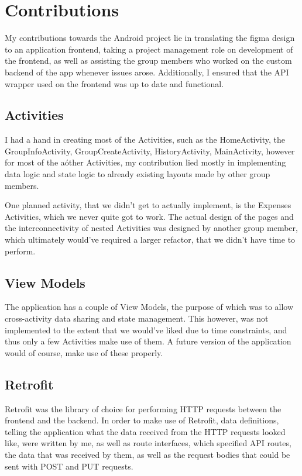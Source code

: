 \section*{Contributions}
My contributions towards the Android project lie in translating the figma design to an application frontend, taking a project management role on development of the frontend, as well as assisting the group members who worked on the custom backend of the app whenever issues arose. Additionally, I ensured that the API wrapper used on the frontend was up to date and functional.

\subsection*{Activities}
I had a hand in creating most of the Activities, such as the HomeActivity, the GroupInfoActivity, GroupCreateActivity, HistoryActivity, MainActivity, however for most of the aóther Activities, my contribution lied mostly in implementing data logic and state logic to already existing layouts made by other group members.

One planned activity, that we didn't get to actually implement, is the Expenses Activities, which we never quite got to work. The actual design of the pages and the interconnectivity of nested Activities was designed by another group member, which ultimately would've required a larger refactor, that we didn't have time to perform.

\subsection*{View Models}
The application has a couple of View Models, the purpose of which was to allow cross-activity data sharing and state management. This however, was not implemented to the extent that we would've liked due to time constraints, and thus only a few Activities make use of them. A future version of the application would of course, make use of these properly.

\subsection*{Retrofit}
Retrofit was the library of choice for performing HTTP requests between the frontend and the backend. In order to make use of Retrofit, data definitions, telling the application what the data received from the HTTP requests looked like, were written by me, as well as route interfaces, which specified API routes, the data that was received by them, as well as the request bodies that could be sent with POST and PUT requests.

